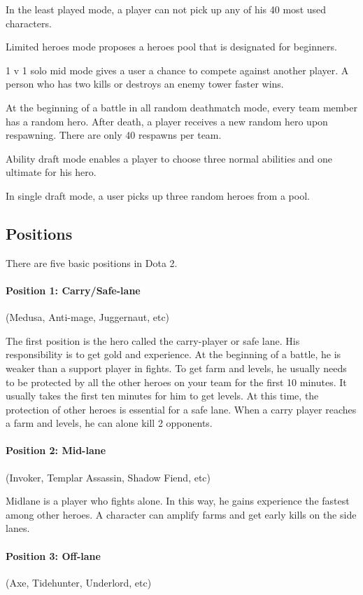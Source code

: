\documentclass[12pt,twoside,english,a4paper]{article}
\begin{document}
In the least played mode, a player can not pick up any of his 40 most used characters.

Limited heroes mode proposes a heroes pool that is designated for beginners.

1 v 1 solo mid mode gives a user a chance to compete against another player. A person who has two kills or destroys an enemy tower faster wins.

At the beginning of a battle in all random deathmatch mode, every team member has a random hero. After death, a player receives a new random hero upon respawning. There are only 40 respawns per team. 

Ability draft mode enables a player to choose three normal abilities and one ultimate for his hero.

In single draft mode, a user picks up three random heroes from a pool.

\subsection{Positions} \label{positions}
There are five basic positions in Dota 2.\cite{ Balaji:Dota}
\paragraph{Position 1: Carry/Safe-lane} (Medusa, Anti-mage, Juggernaut, etc)

The first position is the hero called the carry-player or safe lane. His responsibility is to get gold and experience. At the beginning of a battle, he is weaker than a support player in fights. To get farm and levels, he usually needs to be protected by all the other heroes on your team for the first 10 minutes. It usually takes the first ten minutes for him to get levels. At this time, the protection of other heroes is essential for a safe lane. When a carry player reaches a farm and levels, he can alone kill 2 opponents.
\paragraph{Position 2: Mid-lane} (Invoker, Templar Assassin, Shadow Fiend, etc)

Midlane is a player who fights alone. In this way, he gains experience the fastest among other heroes. A character can amplify farms and get early kills on the side lanes.
\paragraph{Position 3: Off-lane} (Axe, Tidehunter, Underlord, etc)
\end{document}
